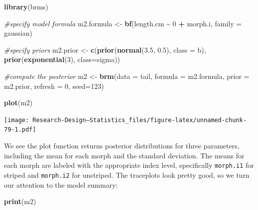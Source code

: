 \documentclass[
]{book}
\newenvironment{Shaded}{\begin{snugshade}}{\end{snugshade}}
\newcommand{\AttributeTok}[1]{\textcolor[rgb]{0.13,0.29,0.53}{#1}}
\newcommand{\CommentTok}[1]{\textcolor[rgb]{0.56,0.35,0.01}{\textit{#1}}}
\newcommand{\DecValTok}[1]{\textcolor[rgb]{0.00,0.00,0.81}{#1}}
\newcommand{\FloatTok}[1]{\textcolor[rgb]{0.00,0.00,0.81}{#1}}
\newcommand{\FunctionTok}[1]{\textcolor[rgb]{0.13,0.29,0.53}{\textbf{#1}}}
\newcommand{\NormalTok}[1]{#1}
\newcommand{\OtherTok}[1]{\textcolor[rgb]{0.56,0.35,0.01}{#1}}
\newcommand{\SpecialCharTok}[1]{\textcolor[rgb]{0.81,0.36,0.00}{\textbf{#1}}}
\begin{document}
\begin{Shaded}
\begin{Highlighting}[]
\FunctionTok{library}\NormalTok{(brms) }

\CommentTok{\#specify model formula}
\NormalTok{m2.formula }\OtherTok{\textless{}{-}} \FunctionTok{bf}\NormalTok{(length.cm }\SpecialCharTok{\textasciitilde{}} \DecValTok{0} \SpecialCharTok{+}\NormalTok{ morph.i,}
                \AttributeTok{family =}\NormalTok{ gaussian)  }

\CommentTok{\#specify priors}
\NormalTok{m2.prior }\OtherTok{\textless{}{-}} \FunctionTok{c}\NormalTok{(}\FunctionTok{prior}\NormalTok{(}\FunctionTok{normal}\NormalTok{(}\FloatTok{3.5}\NormalTok{, }\FloatTok{0.5}\NormalTok{), }\AttributeTok{class =}\NormalTok{ b),}
              \FunctionTok{prior}\NormalTok{(}\FunctionTok{exponential}\NormalTok{(}\DecValTok{3}\NormalTok{), }\AttributeTok{class=}\NormalTok{sigma))}
              
\CommentTok{\#compute the posterior}
\NormalTok{m2 }\OtherTok{\textless{}{-}} \FunctionTok{brm}\NormalTok{(}\AttributeTok{data =}\NormalTok{ tail,}
         \AttributeTok{formula =}\NormalTok{ m2.formula,}
         \AttributeTok{prior =}\NormalTok{ m2.prior,}
         \AttributeTok{refresh =} \DecValTok{0}\NormalTok{,}
         \AttributeTok{seed=}\DecValTok{123}\NormalTok{)}

\FunctionTok{plot}\NormalTok{(m2)}
\end{Highlighting}
\end{Shaded}

\texttt{[image: Research-Design---Statistics\_files/figure-latex/unnamed-chunk-79-1.pdf]}

We see the plot function returns posterior distributions for three parameters, including the mean for each morph and the standard deviation. The means for each morph are labeled with the appropriate index level, specifically \texttt{morph.i1} for striped and \texttt{morph.i2} for unstriped. The traceplots look pretty good, so we turn our attention to the model summary:

\begin{Shaded}
\begin{Highlighting}[]
\FunctionTok{print}\NormalTok{(m2)}
\end{Highlighting}
\end{Shaded}
\end{document}
